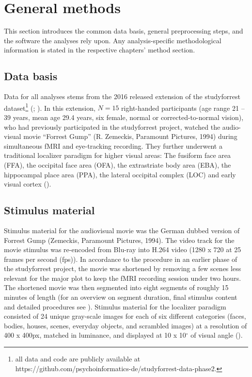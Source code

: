 \documentclass[a4paper, 12pt]{scrreprt}
\begin{document}
\section{General methods}\label{section:generalmethods}

This section introduces the common data basis, general preprocessing steps, and the software the analyses rely upon. Any analysis-specific methodological information is stated in the respective chapters' method section.

\subsection{Data basis}

Data for all analyses stems from the 2016 released extension of the studyforrest dataset\footnote{all data and code are publicly available at https://github.com/psychoinformatics-de/studyforrest-data-phase2.} (\cite{hanke2016studyforrest}; \cite{sengupta2016studyforrest}). In this extension, $N = 15$ right-handed participants (age range 21 – 39 years, mean age 29.4 years, six female, normal or corrected-to-normal vision), who had previously participated in the studyforrest project, watched the audio-visual movie “Forrest Gump” (R. Zemeckis, Paramount Pictures, 1994) during simultaneous fMRI and eye-tracking recording. They further underwent a traditional localizer paradigm for higher visual areas: The fusiform face area (FFA), the occipital face area (OFA), the extrastriate body area (EBA), the hippocampal place area (PPA), the lateral occipital complex (LOC) and early visual cortex (\cite{sengupta2016studyforrest}).

\subsection{Stimulus material}

Stimulus material for the audiovisual movie was the German dubbed version of Forrest Gump (Zemeckis, Paramount Pictures, 1994). The video track for the movie stimulus was re-encoded from Blu-ray into H.264 video (1280 x 720 at 25 frames per second (fps)). In accordance to the procedure in an earlier phase of the studyforrest project, the movie was shortened by removing a few scenes less relevant for the major plot to keep the fMRI recording session under two hours. The shortened movie was then segmented into eight segments of roughly 15 minutes of length (for an overview on segment duration, final stimulus content and detailed procedures see \textcite{hanke2014high}). Stimulus material for the localizer paradigm consisted of 24 unique gray-scale images for each of six different categories (faces, bodies, houses, scenes, everyday objects, and scrambled images) at a resolution of 400 x 400px, matched in luminance, and displayed at 10 x 10$^\circ$ of visual angle (\cite{sengupta2016studyforrest}). 
\end{document}
